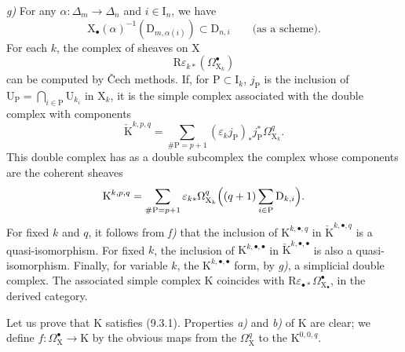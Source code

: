 \documentclass[11pt,leqno]{article}
\begin{document}
\textit{g)} For any \(\alpha:\Delta_{m}\to\Delta_{n}\) and \(i\in\mathrm{I}_{n}\), we have
\[
\mathrm{X}_{\bullet}(\alpha)^{-1}(\mathrm{D}_{m,\alpha(i)})
\subset\mathrm{D}_{n,i}
\qquad\text{(as a scheme).}
\]
For each \(k\), the complex of sheaves on \(\mathrm{X}\)
\[
\mathrm{R}\varepsilon_{k*}(\Omega_{\mathrm{X}_{k}}^{\bullet})
\]
can be computed by Čech methods. If, for \(\mathrm{P}\subset\mathrm{I}_{k}\), \(j_{\mathrm{P}}\) is the inclusion of \(\mathrm{U}_{\mathrm{P}}=\bigcap_{i\in\mathrm{P}}\mathrm{U}_{k_i}\) in \(\mathrm{X}_{k}\), it is the simple complex associated with the double complex with components
\[
\check{\mathrm{K}}^{k,p,q}
=\sum_{\#\mathrm{P}=p+1}
(\varepsilon_{k}j_{\mathrm{P}})_{*}j_{\mathrm{P}}^{*}\Omega_{\mathrm{X}_{k}}^{q}.
\]
This double complex has as a double subcomplex the complex whose components are the coherent sheaves
\[
\mathrm{K}^{k,p,q}
=\sum_{\#\mathrm{P}=p+1}
\varepsilon_{k*}\Omega_{\mathrm{X}_{k}}^{q}
\Bigl((q+1)\sum_{i\in\mathrm{P}}\mathrm{D}_{k,i}\Bigr).
\]
For fixed \(k\) and \(q\), it follows from \textit{f)} that the inclusion of \(\mathrm{K}^{k,\bullet,q}\) in \(\check{\mathrm{K}}^{k,\bullet,q}\) is a quasi-isomorphism. For fixed \(k\), the inclusion of \(\mathrm{K}^{k,\bullet,\bullet}\) in \(\check{\mathrm{K}}^{k,\bullet,\bullet}\) is also a quasi-isomorphism. Finally, for variable \(k\), the \(\mathrm{K}^{k,\bullet,\bullet}\) form, by \textit{g)}, a simplicial double complex. The associated simple complex \(\mathrm{K}\) coincides with \(\mathrm{R}\varepsilon_{\bullet *}\Omega_{\mathrm{X}_{\bullet}}^{\bullet}\), in the derived category.

Let us prove that \(\mathrm{K}\) satisfies (9.3.1). Properties \textit{a)} and \textit{b)} of \(\mathrm{K}\) are clear; we define \(f:\Omega_{\mathrm{X}}^{\bullet}\to\mathrm{K}\) by the obvious maps from the \(\Omega_{\mathrm{X}}^{q}\) to the \(\mathrm{K}^{0,0,q}\).
\end{document}
